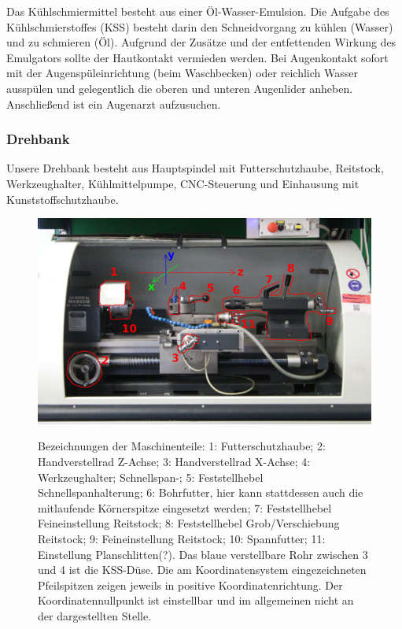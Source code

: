 \documentclass{\basedir/fablab-document}
\begin{document}
Das Kühlschmiermittel besteht aus einer Öl-Wasser-Emulsion.
Die Aufgabe des Kühlschmierstoffes (KSS) besteht darin den Schneidvorgang zu kühlen (Wasser) und zu schmieren (Öl).
Aufgrund der Zusätze und der entfettenden Wirkung des Emulgators sollte der Hautkontakt vermieden werden.
Bei Augenkontakt sofort mit der Augenspüleinrichtung (beim Waschbecken) oder reichlich Wasser ausspülen und gelegentlich die oberen und unteren Augenlider anheben.
Anschließend ist ein Augenarzt aufzusuchen.

\subsubsection{Drehbank}
Unsere Drehbank besteht aus Hauptspindel mit Futterschutzhaube, Reitstock, Werkzeughalter, Kühlmittelpumpe, CNC-Steuerung und Einhausung mit Kunststoffschutzhaube.
\begin{figure}[ht]
\centering
\includegraphics[width = 0.9\linewidth]{img/drehbank-uebersicht-beschreibung} \\
\caption{Bezeichnungen der Maschinenteile: 1: Futterschutzhaube; 2: Handverstellrad Z-Achse; 3: Handverstellrad X-Achse; 4: Werkzeughalter; Schnellspan-; 5: Feststellhebel Schnellspanhalterung; 6: Bohrfutter, hier kann stattdessen auch die mitlaufende Körnerspitze eingesetzt werden; 7: Feststellhebel Feineinstellung Reitstock; 8: Feststellhebel Grob/Verschiebung Reitstock; 9: Feineinstellung Reitstock; 10: Spannfutter; 11: Einstellung Planschlitten(?). Das blaue verstellbare Rohr zwischen 3 und 4 ist die KSS-Düse. Die am Koordinatensystem eingezeichneten Pfeilspitzen zeigen jeweils in positive Koordinatenrichtung. Der Koordinatennullpunkt ist einstellbar und im allgemeinen nicht an der dargestellten Stelle.}
\end{figure}
\end{document}
